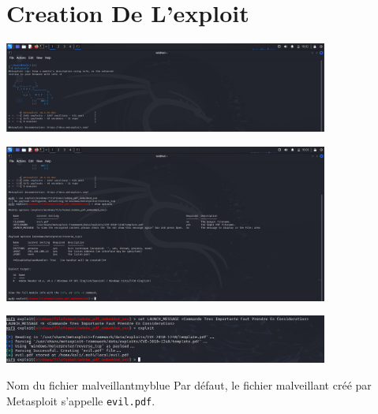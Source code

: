 \section{Creation De L'exploit}

\begin{center}
    \includegraphics[width=0.8\textwidth]{Question/SC/4-.PNG}
\end{center}

\vspace{0.15cm}

\begin{center}
    \includegraphics[width=0.8\textwidth]{Question/SC/5_6-.PNG}
\end{center}

\vspace{0.15cm}

\begin{center}
    \includegraphics[width=0.8\textwidth]{Question/SC/7_8-.PNG}
\end{center}

\vspace{0.35cm}

\begin{prettyBox}{Nom du fichier malveillant}{myblue}
    Par défaut, le fichier malveillant créé par Metasploit s'appelle \texttt{evil.pdf}.
\end{prettyBox}

